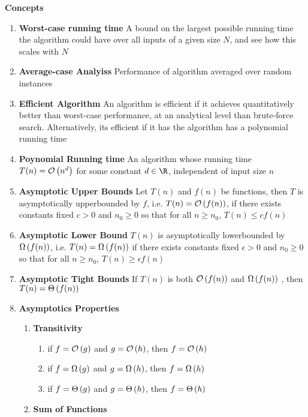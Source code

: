 \documentclass[11pt]{article}
\begin{document}
\begin{defn*}
    \textbf{Concepts}
    \begin{enumerate}
        \item \textbf{Worst-case running time} A bound on the largest possible running time the algorithm could have over all inputs of a given size $N$, and see how this scales with $N$
        \item \textbf{Average-case Analyiss} Performance of algorithm averaged over random instances
        \item \textbf{Efficient Algorithm} An algorithm is efficient if it achieves quantitatively better than worst-case performance, at an analytical level than brute-force search. Alternatively, its efficient if it has the algorithm has a polynomial running time
        \item \textbf{Poynomial Running time} An algorithm whose running time $T(n) = \mathcal{O}\left( n^d \right)$ for some constant $d\in \R$, independent of input size $n$
        \item \textbf{Asymptotic Upper Bounds} Let $T(n)$ and $f(n)$ be functions, then $T$ is asymptotically upperbounded by $f$, i.e. $T(n) = \mathcal{O}\left( f(n) \right)$, if there exists constants fixed $c>0$ and $n_0 \geq 0$ so that for all $n\geq n_0$, $T(n) \leq cf(n)$
        \item \textbf{Asymptotic Lower Bound} $T(n)$ is asymptotically lowerbounded by $\Omega\left( f(n) \right)$, i.e. $T(n) = \Omega\left( f(n) \right)$ if there exists constants fixed $\epsilon > 0$ and $n_0 \geq 0$ so that for all $n\geq n_0$, $T(n) \geq \epsilon f(n)$ 
        \item \textbf{Asymptotic Tight Bounds} If $T(n)$ is both $\mathcal{O}\left( f(n) \right)$ and $\Omega\left( f(n) \right)$ , then $T(n) = \Theta\left( f(n) \right)$
        \item \textbf{Asymptotics Properties}
        \begin{enumerate}
            \item \textbf{Transitivity} 
            \begin{enumerate}
                \item if  $f = \mathcal{O}\left( g \right)$ and $g = \mathcal{O}\left( h \right)$, then $f = \mathcal{O}\left( h \right)$
                \item if  $f = \Omega\left( g \right)$ and $g = \Omega\left( h \right)$, then $f = \Omega\left( h \right)$
                \item if  $f = \Theta\left( g \right)$ and $g = \Theta\left( h \right)$, then $f = \Theta\left( h \right)$
            \end{enumerate}
            \item \textbf{Sum of Functions} 
            \begin{enumerate}

\end{enumerate}
\end{enumerate}
\end{enumerate}
\end{defn*}
\end{document}
